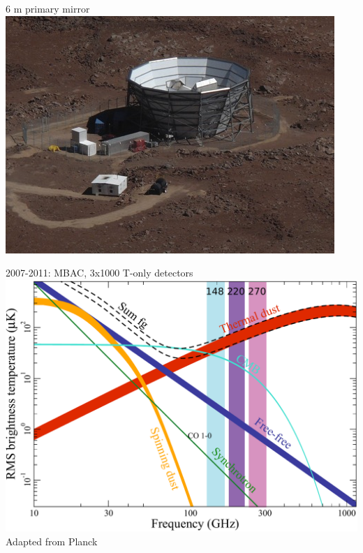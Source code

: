 \documentclass[table]{beamer}
\begin{document}
\begin{frame}{6 m primary mirror}
	\centering
	\includegraphics[width=\textwidth]{act_closeup_hincks.png}
\end{frame}
\begin{frame}{2007-2011: MBAC, 3x1000 T-only detectors}
	\centering
	\includegraphics[width=\textwidth]{act_freqs.pdf}\\
	\footnotesize{Adapted from Planck}
\end{frame}
\end{document}
